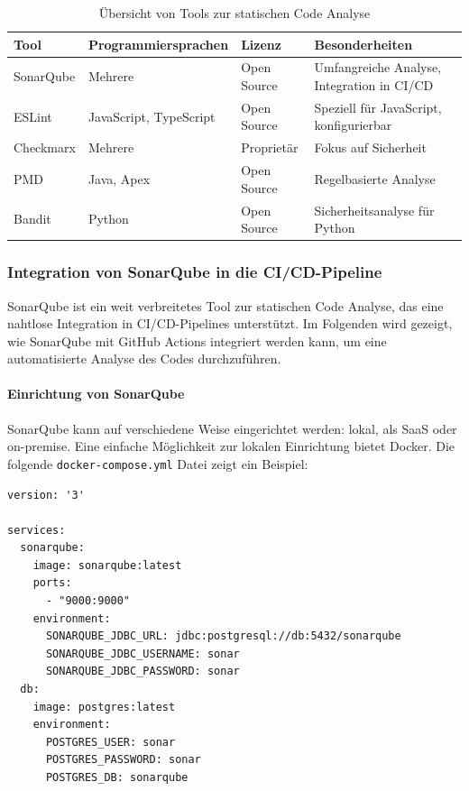 \begin{table}[h!]
\centering
\begin{tabular}{|l|l|l|l|}
\hline
\textbf{Tool} & \textbf{Programmiersprachen} & \textbf{Lizenz} & \textbf{Besonderheiten} \\ \hline
SonarQube & Mehrere & Open Source & Umfangreiche Analyse, Integration in CI/CD \\ \hline
ESLint & JavaScript, TypeScript & Open Source & Speziell für JavaScript, konfigurierbar \\ \hline
Checkmarx & Mehrere & Proprietär & Fokus auf Sicherheit \\ \hline
PMD & Java, Apex & Open Source & Regelbasierte Analyse \\ \hline
Bandit & Python & Open Source & Sicherheitsanalyse für Python \\ \hline
\end{tabular}
\caption{Übersicht von Tools zur statischen Code Analyse}
\label{tab:static_code_analysis_tools}
\end{table}

\subsubsection{Integration von SonarQube in die CI/CD-Pipeline}

SonarQube ist ein weit verbreitetes Tool zur statischen Code Analyse, das eine nahtlose Integration in CI/CD-Pipelines unterstützt. Im Folgenden wird gezeigt, wie SonarQube mit GitHub Actions integriert werden kann, um eine automatisierte Analyse des Codes durchzuführen.

\paragraph{Einrichtung von SonarQube}

SonarQube kann auf verschiedene Weise eingerichtet werden: lokal, als SaaS oder on-premise. Eine einfache Möglichkeit zur lokalen Einrichtung bietet Docker. Die folgende \texttt{docker-compose.yml} Datei zeigt ein Beispiel:

\begin{lstlisting}
version: '3'

services:
  sonarqube:
    image: sonarqube:latest
    ports:
      - "9000:9000"
    environment:
      SONARQUBE_JDBC_URL: jdbc:postgresql://db:5432/sonarqube
      SONARQUBE_JDBC_USERNAME: sonar
      SONARQUBE_JDBC_PASSWORD: sonar
  db:
    image: postgres:latest
    environment:
      POSTGRES_USER: sonar
      POSTGRES_PASSWORD: sonar
      POSTGRES_DB: sonarqube
\end{lstlisting}

